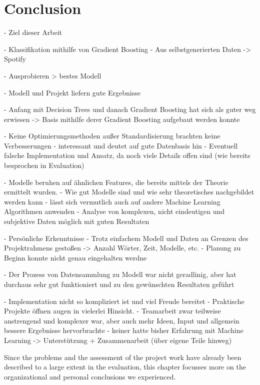 \section{Conclusion}

- Ziel dieser Arbeit 

    - Klassifikation mithilfe von Gradient Boosting 
    - Aus selbstgenerierten Daten -> Spotify

    - Ausprobieren > bestes Modell 

- Modell und Projekt liefern gute Ergebnisse 

    - Anfang mit Decision Trees und danach Gradient Boosting hat sich als guter weg erwiesen
        -> Basis mithilfe derer Gradient Boosting aufgebaut werden konnte 

    - Keine Optimierungsmethoden außer Standardisierung brachten keine Verbesserungen
        - interessant und deutet auf gute Datenbasis hin 
        - Eventuell falsche Implementation und Ansatz, da noch viele Details offen sind (wie bereits besprochen in Evaluation)

    - Modelle beruhen auf ähnlichen Features, die bereits mittels der Theorie ermittelt wurden. 
        - Wie gut Modelle sind und wie sehr theoretisches nachgebildet werden kann
        - lässt sich vermutlich auch auf andere Machine Learning Algorithmen anwenden 
            - Analyse von komplexen, nicht eindeutigen und subjektive Daten möglich mit guten Resultaten 

-   Persönliche Erkenntnisse
    - Trotz einfachem Modell und Daten an Grenzen des Projektrahmens gestoßen -> Anzahl Wörter, Zeit, Modelle, etc. 
        - Planung zu Beginn konnte nicht genau eingehalten werdne 

    - Der Prozess von Datensammlung zu Modell war nicht geradlinig, aber hat durchaus sehr gut funktioniert und zu den 
      gewünschten Resultaten geführt 

    - Implementation nicht so kompliziert ist und viel Freude bereitet
    - Praktische Projekte öffnen augen in vielerlei Hinsicht. 
    - Teamarbeit zwar teilweise anstrengend und komplexer war, aber auch mehr Ideen, Input und allgemein bessere Ergebnisse hervorbrachte 
        - keiner hatte bisher Erfahrung mit Machine Learning -> Unterstützung  + Zusammenarbeit (über eigene Teile hinweg)

        Since the problems and the assessment of the project work have already been described to a large extent in the evaluation, 
        this chapter focusses more on the organizational and personal conclusions we experienced. 

